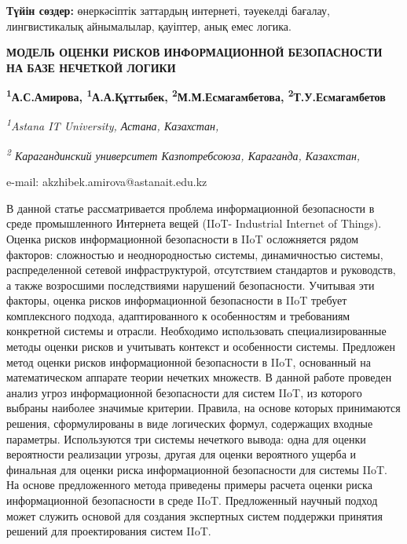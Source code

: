 {\bfseries Түйін сөздер:} өнеркәсіптік заттардың интернеті, тәуекелді
бағалау, лингвистикалық айнымалылар, қауіптер, анық емес логика.

\begin{articleheader}
{\bfseries МОДЕЛЬ ОЦЕНКИ РИСКОВ ИНФОРМАЦИОННОЙ БЕЗОПАСНОСТИ НА БАЗЕ НЕЧЕТКОЙ ЛОГИКИ}

{\bfseries
\textsuperscript{1}А.С.Амирова\textsuperscript{\envelope },
\textsuperscript{1}А.А.Құттыбек,
\textsuperscript{2}М.М.Есмагамбетова,
\textsuperscript{2}Т.У.Есмагамбетов}
\end{articleheader}

\begin{affiliation}
\emph{\textsuperscript{1}Astana IT University, Астана, Казахстан,}

\emph{\textsuperscript{2} Карагандинский университет Казпотребсоюза, Караганда, Казахстан,}

e-mail: akzhibek.amirova@astanait.edu.kz
\end{affiliation}

В данной статье рассматривается проблема информационной безопасности в
среде промышленного Интернета вещей (IIoT- Industrial Internet of
Things). Оценка рисков информационной безопасности в IIoT осложняется
рядом факторов: сложностью и неоднородностью системы, динамичностью
системы, распределенной сетевой инфраструктурой, отсутствием стандартов
и руководств, а также возросшими последствиями нарушений безопасности.
Учитывая эти факторы, оценка рисков информационной безопасности в IIoT
требует комплексного подхода, адаптированного к особенностям и
требованиям конкретной системы и отрасли. Необходимо использовать
специализированные методы оценки рисков и учитывать контекст и
особенности системы. Предложен метод оценки рисков информационной
безопасности в IIoT, основанный на математическом аппарате теории
нечетких множеств. В данной работе проведен анализ угроз информационной
безопасности для систем IIoT, из которого выбраны наиболее значимые
критерии. Правила, на основе которых принимаются решения, сформулированы
в виде логических формул, содержащих входные параметры. Используются три
системы нечеткого вывода: одна для оценки вероятности реализации угрозы,
другая для оценки вероятного ущерба и финальная для оценки риска
информационной безопасности для системы IIoT. На основе предложенного
метода приведены примеры расчета оценки риска информационной
безопасности в среде IIoT. Предложенный научный подход может служить
основой для создания экспертных систем поддержки принятия решений для
проектирования систем IIoT.

